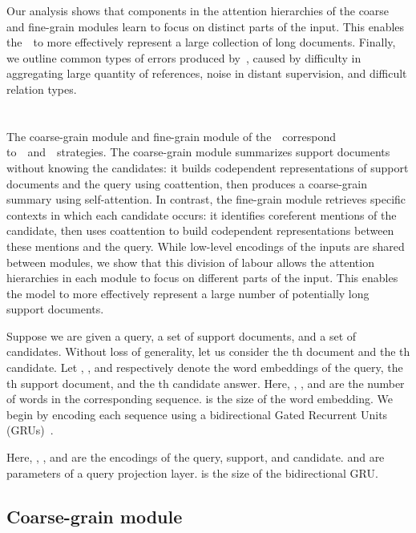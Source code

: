 \documentclass{article} \usepackage{iclr2019_conference,times}
\begin{document}
Our analysis shows that components in the attention hierarchies of the coarse and fine-grain modules learn to focus on distinct parts of the input.
This enables the~\modelnameshort~to more effectively represent a large collection of long documents.
Finally, we outline common types of errors produced by~\modelnameshort, caused by difficulty in aggregating large quantity of references, noise in distant supervision, and difficult relation types.



\section{\modelname}

The coarse-grain module and fine-grain module of the~\modelnameshort~correspond to~\coarsereasoning~and~\finereasoning~strategies.
The coarse-grain module summarizes support documents without knowing the candidates: it builds codependent representations of support documents and the query using coattention, then produces a coarse-grain summary using self-attention.
In contrast, the fine-grain module retrieves specific contexts in which each candidate occurs:
it identifies coreferent mentions of the candidate, then uses coattention to build codependent representations between these mentions and the query.
While low-level encodings of the inputs are shared between modules, we show that this division of labour allows the attention hierarchies in each module to focus on different parts of the input.
This enables the model to more effectively represent a large number of potentially long support documents.


Suppose we are given a query, a set of  support documents, and a set of  candidates.
Without loss of generality, let us consider the th document and the th candidate.
Let , , and  respectively denote the word embeddings of the query, the th support document, and the th candidate answer.
Here, , , and  are the number of words in the corresponding sequence.
 is the size of the word embedding.
We begin by encoding each sequence using a bidirectional Gated Recurrent Units (GRUs)~\citep{cho2014learning}.



Here, , , and  are the encodings of the query, support, and candidate.
 and  are parameters of a query projection layer.
 is the size of the bidirectional GRU.


\subsection{Coarse-grain module}
\end{document}
